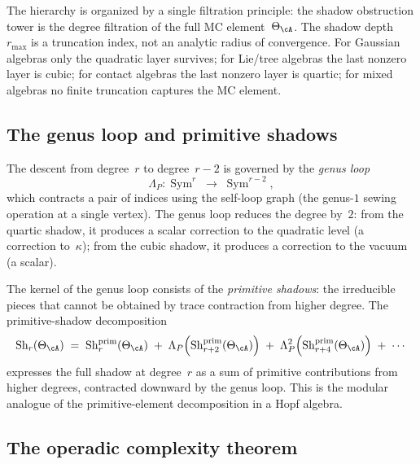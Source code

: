 The hierarchy is organized by a single filtration principle: the
shadow obstruction tower is the degree filtration of the full MC
element~$\Theta_\cA$. The shadow depth~$r_{\max}$ is a truncation
index, not an analytic radius of convergence. For Gaussian algebras
only the quadratic layer survives; for Lie/tree algebras the last
nonzero layer is cubic; for contact algebras the last nonzero layer is
quartic; for mixed algebras no finite truncation captures the MC
element.

\subsection{The genus loop and primitive shadows}
\label{subsec:thqg-intro-genus-loop}

The descent from degree~$r$ to degree~$r-2$ is governed by the
\emph{genus loop}
\begin{equation}\label{eq:thqg-intro-genus-loop}
\Lambda_P \colon \operatorname{Sym}^r
\;\longrightarrow\;
\operatorname{Sym}^{r-2},
\end{equation}
which contracts a pair of indices using the self-loop graph
(the genus-$1$ sewing operation at a single vertex).
The genus loop reduces the degree by~$2$: from the quartic shadow,
it produces a scalar correction to the quadratic level (a correction
to~$\kappa$); from the cubic shadow, it produces a correction to
the vacuum (a scalar).

The kernel of the genus loop consists of the \emph{primitive shadows}:
the irreducible pieces that cannot be obtained by trace contraction
from higher degree. The primitive-shadow decomposition
\begin{equation}\label{eq:thqg-intro-primitive-decomposition}
\operatorname{Sh}_r(\Theta_\cA)
\;=\;
\operatorname{Sh}_r^{\mathrm{prim}}(\Theta_\cA)
\;+\;
\Lambda_P\!\left(
 \operatorname{Sh}_{r+2}^{\mathrm{prim}}(\Theta_\cA)
\right)
\;+\;
\Lambda_P^2\!\left(
 \operatorname{Sh}_{r+4}^{\mathrm{prim}}(\Theta_\cA)
\right)
\;+\; \cdots
\end{equation}
expresses the full shadow at degree~$r$ as a sum of primitive
contributions from higher degrees, contracted downward by the
genus loop. This is the modular analogue of the
primitive-element decomposition in a Hopf algebra.

\subsection{The operadic complexity theorem}
\label{subsec:thqg-intro-operadic-complexity}

